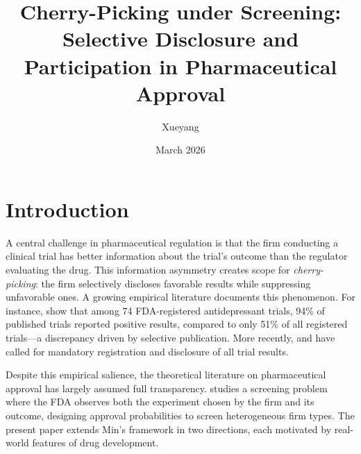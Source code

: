 \documentclass[12pt,a4paper]{article}
\title{Cherry-Picking under Screening:\\
  Selective Disclosure and Participation in
  Pharmaceutical Approval}
\author{Xueyang}
\date{March 2026}
\begin{document}
\maketitle


\section{Introduction}
\label{sec:intro}

A central challenge in pharmaceutical regulation is that the
firm conducting a clinical trial has better information about
the trial's outcome than the regulator evaluating the drug.
This information asymmetry creates scope for
\emph{cherry-picking}: the firm selectively discloses
favorable results while suppressing unfavorable ones. A
growing empirical literature documents this phenomenon. For
instance, \citet{turner2008} show that among 74 FDA-registered
antidepressant trials, 94\% of published trials reported
positive results, compared to only 51\% of all registered
trials---a discrepancy driven by selective publication. More
recently, \citet{deangelis2004} and
\citet{alltrials2013} have called for mandatory registration
and disclosure of all trial results.

Despite this empirical salience, the theoretical literature on
pharmaceutical approval has largely assumed full transparency.
\citet{min2023} studies a screening problem where the FDA
observes both the experiment chosen by the firm and its
outcome, designing approval probabilities to screen
heterogeneous firm types. The present paper extends Min's
framework in two directions, each motivated by real-world
features of drug development.
\end{document}
